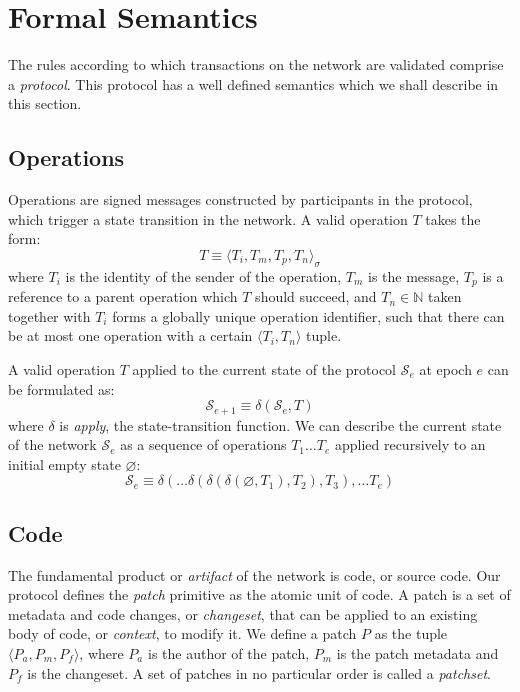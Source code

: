 \section{Formal Semantics}

The rules according to which transactions on the \oscoin{} network are
validated comprise a \emph{protocol}. This protocol has a well defined semantics
which we shall describe in this section.

\subsection{Operations}

Operations are signed messages constructed by participants in the protocol,
which trigger a state transition in the network. A valid operation $T$ takes
the form:
\[
    T \equiv \langle T_i, T_m, T_p, T_n \rangle_{\sigma}
\]
where $T_i$ is the identity of the sender of the operation, $T_m$ is the
message, $T_p$ is a reference to a parent operation which $T$ should succeed,
and $T_n \in \mathbb{N}$ taken together with $T_i$ forms a globally unique
operation identifier, such that there can be at most one operation with a
certain $\langle T_i, T_n \rangle$ tuple.

A valid operation $T$ applied to the current state of
the protocol $\mathcal{S}_e$ at epoch $e$ can be formulated as:
\[
    \mathcal{S}_{e+1} \equiv \delta(\mathcal{S}_e, T)
\]
where $\delta$ is \emph{apply}, the state-transition function.  We can
describe the current state of the network $\mathcal{S}_e$ as a sequence of
operations ${T_1 \dots T_e}$ applied recursively to an initial empty state
$\varnothing$:
\[
    \mathcal{S}_e \equiv \delta(\dots \delta(\delta(\delta(\varnothing,
    T_1), T_2), T_3), \dots T_e)
\]

\subsection{Code} The fundamental product or \emph{artifact} of the \oscoin{}
network is code, or source code. Our protocol defines the \emph{patch}
primitive as the atomic unit of code. A patch is a set of metadata and code
changes, or \emph{changeset}, that can be applied to an existing body of code,
or \emph{context}, to modify it. We define a patch $P$ as the tuple $\langle
P_a, P_m, P_f \rangle$, where $P_a$ is the author of the patch, $P_m$ is the
patch metadata and $P_f$ is the changeset. A set of patches in no particular
order is called a \emph{patchset}.

